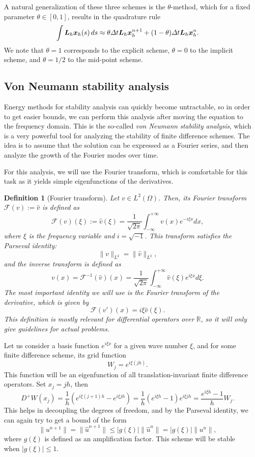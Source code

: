 \documentclass{article}
\renewcommand{\vec}{\vectorsym}
\newcommand{\mat}{\matrixsym}
\newtheorem{definition}{Definition}
\newcommand{\R}{\mathbb{R}}
\begin{document}
    A natural generalization of these three schemes is the $\theta$-method, which for a fixed parameter $\theta\in[0,1]$, results in the quadrature rule
    $$\int \mat L_h \vec x_h(s)\,ds \approx \theta\Delta t \mat L_h\vec x_h^{n+1} + (1-\theta)\Delta t \mat L_h \vec x_h^n. $$
    We note that $\theta=1$ corresponds to the explicit scheme, $\theta=0$ to the implicit scheme, and $\theta=1/2$ to the mid-point scheme. 
    
\subsection{Von Neumann stability analysis}
Energy methods for stability analysis can quickly become untractable, so in order to get easier bounds, we can perform this analysis after moving the equation to the frequency domain. This is the so-called \emph{von Neumann stability analysis}, which is a very powerful tool for analyzing the stability of finite difference schemes. The idea is to assume that the solution can be expressed as a Fourier series, and then analyze the growth of the Fourier modes over time.

For this analysis, we will use the Fourier transform, which is comfortable for this task as it yields simple eigenfunctions of the derivatives. 

\begin{definition}[Fourier transform]
    Let $v\in L^2(\Omega)$. Then, its Fourier transform $\mathcal{F}(v) := \hat{v}$ is defined as
    $$ \mathcal{F}(v)(\xi) := \hat{v}(\xi) = \frac{1}{\sqrt{2\pi}}\int_{-\infty}^{+\infty} v(x)e^{-i\xi x}dx, $$
    where $\xi$ is the frequency variable and $i=\sqrt{-1}$. This transform satisfies the Parseval identity:
    $$ \| v\|_{L^2} = \| \hat{v}\|_{L^2}, $$
    and the inverse transform is defined as
    $$ v(x) = \mathcal{F}^{-1}(\hat{v})(x) = \frac{1}{\sqrt{2\pi}}\int_{-\infty}^{+\infty} \hat{v}(\xi)e^{i\xi x}d\xi. $$
    The most important identity we will use is the Fourier transform of the derivative, which is given by
    $$ \mathcal{F}(v')(x) = i\xi \hat{v}(\xi). $$
    This definition is mostly relevant for differential operators over $\R$, so it will only give guidelines for actual problems.
\end{definition}
Let us consider a basis function $e^{i\xi x}$ for a given wave number $\xi$, and for some finite difference scheme, its grid function
$$W_j = e^{i\xi (jh)}.$$
This function will be an eigenfunction of all translation-invariant finite difference operators. Set $x_j = jh$, then
$$D^+ W(x_j) = \frac{1}{h}\left(e^{i\xi (j+1)h} - e^{i\xi j h}\right) = \frac{1}{h}\left(e^{i\xi h} - 1\right)e^{i\xi j h} = \frac{e^{i\xi h} - 1}{h}W_j.$$
This helps in decoupling the degrees of freedom, and by the Parseval identity, we can again try to get a bound of the form
$$\|u^{n+1}\| = \|\hat{u}^{n+1}\|\leq |g(\xi)| \|\hat{u}^{n}\| = |g(\xi)| \|u^n\|,$$
where $g(\xi)$ is defined as an amplification factor. This scheme will be stable when $|g(\xi)|\leq 1$.
\end{document}
